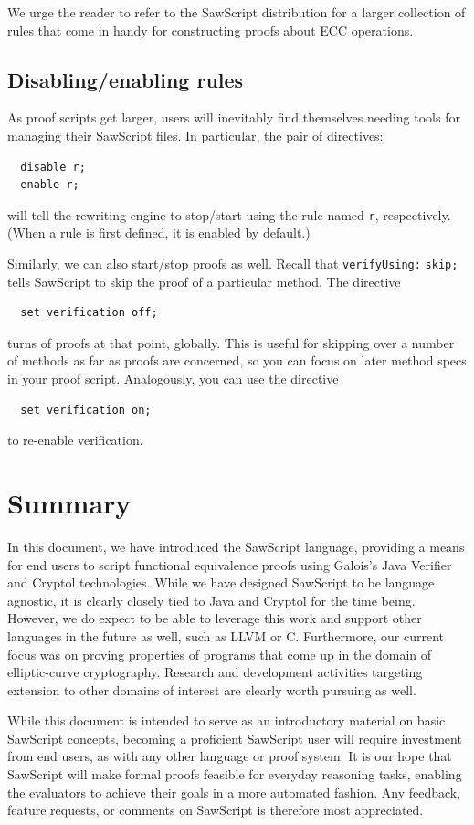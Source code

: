 \documentclass[12pt]{galois-whitepaper}
\newcommand{\sawScript}{{\sc SawScript}\xspace}
\begin{document}
We urge the reader to refer to the \sawScript distribution for a larger collection of rules that come in handy
for constructing proofs about ECC operations.

\subsection{Disabling/enabling rules}
As proof scripts get larger, users will inevitably find themselves needing tools for managing their \sawScript files.
In particular, the pair of directives:
\begin{Verbatim}
  disable r;
  enable r;
\end{Verbatim}
will tell the rewriting engine to stop/start using the rule named {\tt r}, respectively.
(When a rule is first defined, it is enabled by default.)

Similarly, we can also start/stop proofs as well. Recall that {\tt verifyUsing:} {\tt skip;}
tells \sawScript to skip the proof of a particular method. The directive
\begin{Verbatim}
  set verification off;
\end{Verbatim}
turns of proofs at that point, globally.
This is useful for skipping over a number of methods as far as proofs are concerned, so you can focus on later method specs in your proof
script. Analogously, you can use the directive
\begin{Verbatim}
  set verification on;
\end{Verbatim}
to re-enable verification.

\section{Summary}
In this document, we have introduced the \sawScript language, providing a means for end users to script functional equivalence proofs
using Galois's Java Verifier and Cryptol technologies. While we have designed \sawScript to be language agnostic, it is clearly
closely tied to Java and Cryptol for the time being. However, we do expect to be able to leverage this work and support other languages
in the future as well, such as LLVM or C. Furthermore, our current focus was on proving properties of programs that come up in the domain
of elliptic-curve cryptography. Research and development activities targeting extension to other domains of interest are clearly worth pursuing
as well.

While this document is intended to serve as an introductory material on basic \sawScript concepts, becoming a proficient \sawScript user will require
investment from end users, as with any other language or proof system. It is our hope that \sawScript will make formal proofs feasible for everyday
reasoning tasks, enabling the evaluators to achieve their goals in a more automated fashion. Any feedback, feature requests, or
comments on \sawScript is therefore most appreciated.
\newpage
\appendix
\end{document}
